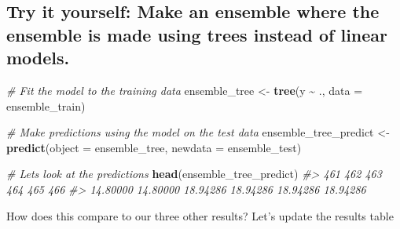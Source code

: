 \documentclass[
]{book}
\newenvironment{Shaded}{\begin{snugshade}}{\end{snugshade}}
\newcommand{\AttributeTok}[1]{\textcolor[rgb]{0.13,0.29,0.53}{#1}}
\newcommand{\CommentTok}[1]{\textcolor[rgb]{0.56,0.35,0.01}{\textit{#1}}}
\newcommand{\FunctionTok}[1]{\textcolor[rgb]{0.13,0.29,0.53}{\textbf{#1}}}
\newcommand{\NormalTok}[1]{#1}
\newcommand{\OtherTok}[1]{\textcolor[rgb]{0.56,0.35,0.01}{#1}}
\newcommand{\SpecialCharTok}[1]{\textcolor[rgb]{0.81,0.36,0.00}{\textbf{#1}}}
\begin{document}
\subsection{Try it yourself: Make an ensemble where the ensemble is made using trees instead of linear models.}\label{try-it-yourself-make-an-ensemble-where-the-ensemble-is-made-using-trees-instead-of-linear-models.}

\begin{Shaded}
\begin{Highlighting}[]
\CommentTok{\# Fit the model to the training data}
\NormalTok{ensemble\_tree }\OtherTok{\textless{}{-}} \FunctionTok{tree}\NormalTok{(y }\SpecialCharTok{\textasciitilde{}}\NormalTok{ ., }\AttributeTok{data =}\NormalTok{ ensemble\_train)}

\CommentTok{\# Make predictions using the model on the test data}
\NormalTok{ensemble\_tree\_predict }\OtherTok{\textless{}{-}} \FunctionTok{predict}\NormalTok{(}\AttributeTok{object =}\NormalTok{ ensemble\_tree, }\AttributeTok{newdata =}\NormalTok{ ensemble\_test)}

\CommentTok{\# Let\textquotesingle{}s look at the predictions}
\FunctionTok{head}\NormalTok{(ensemble\_tree\_predict)}
\CommentTok{\#\textgreater{}      461      462      463      464      465      466 }
\CommentTok{\#\textgreater{} 14.80000 14.80000 18.94286 18.94286 18.94286 18.94286}
\end{Highlighting}
\end{Shaded}

\begin{Shaded}
\end{Shaded}

How does this compare to our three other results? Let's update the
results table
\end{document}
